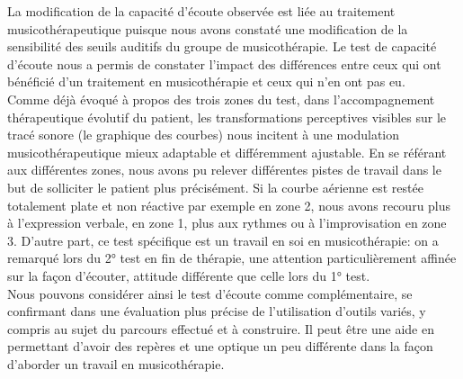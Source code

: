 \begin{itemize}
  
 	La modification de la capacité d'écoute observée est liée
 au traitement musicothérapeutique 
  puisque nous avons constaté une modification de la  
 sensibilité des 
 seuils auditifs du groupe de musicothérapie.
Le test de capacité d'écoute nous a permis de constater l'impact des différences  entre ceux qui ont 
bénéficié d'un 
 traitement en  musicothérapie et ceux qui n'en ont pas eu.
  \\
  Comme déjà évoqué à propos des trois zones du test, 
 dans l'accompagnement thérapeutique évolutif du patient,
 les transformations perceptives visibles sur
 le tracé sonore (le graphique des courbes) nous incitent à une modulation
 musicothérapeutique mieux adaptable et différemment ajustable.
 En se référant aux
 différentes zones, nous avons pu relever différentes pistes de travail dans le but de
 solliciter le patient plus précisément. 
 Si la courbe aérienne est restée
 totalement plate et non
 réactive par exemple en zone 2, nous avons recouru plus à l'expression verbale, en zone 1, plus aux 
 rythmes ou à l'improvisation en zone 3.
 D'autre part, ce test spécifique est un travail en soi en musicothérapie: on a remarqué  lors du 2° test en 
 fin de 
 thérapie, une attention particulièrement affinée sur la façon d'écouter,  attitude différente que celle lors 
 du 1° test.
  \\
  Nous pouvons considérer ainsi le test d'écoute comme complémentaire, se confirmant dans une 
  évaluation plus
 précise de l'utilisation d'outils variés, y compris au sujet du parcours effectué et à
 construire. Il peut être une aide en permettant  d'avoir des repères et une optique un peu différente dans 
 la façon d'aborder un travail en musicothérapie.
  \newline 
 
 
 
 

\end{itemize}
